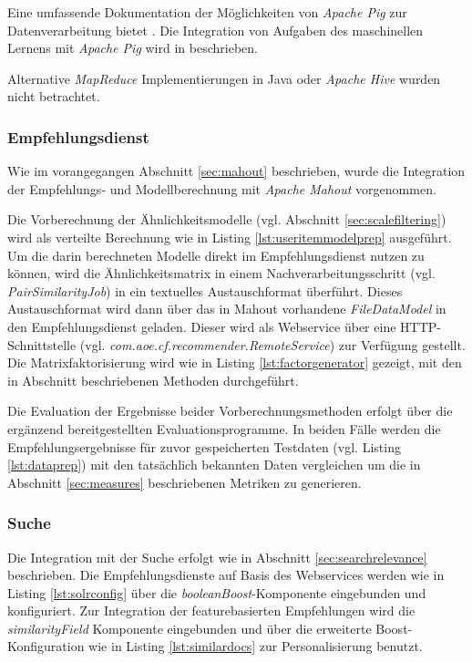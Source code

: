  

Eine umfassende Dokumentation der Möglichkeiten von \textit{Apache Pig} zur Datenverarbeitung bietet \citep{gates2011programming}. Die Integration von Aufgaben des maschinellen Lernens mit  \textit{Apache Pig} wird in  \citep{Lin2012} beschrieben.

Alternative \textit{MapReduce} Implementierungen in Java oder \textit{Apache Hive} wurden nicht betrachtet.

\subsubsection{Empfehlungsdienst} Wie im vorangegangen Abschnitt \ref{sec:mahout} beschrieben, wurde die Integration der Empfehlungs- und Modellberechnung mit \textit{Apache Mahout} vorgenommen.

Die Vorberechnung der Ähnlichkeitsmodelle (vgl. Abschnitt \ref{sec:scalefiltering}) wird als verteilte Berechnung wie in Listing \ref{lst:useritemmodelprep} ausgeführt. Um die darin berechneten Modelle direkt im Empfehlungsdienst nutzen zu können, wird die Ähnlichkeitsmatrix in einem Nachverarbeitungsschritt (vgl. \textit{PairSimilarityJob}) in ein textuelles Austauschformat überführt. Dieses Austauschformat wird dann über das in Mahout vorhandene \textit{FileDataModel} in den Empfehlungsdienst geladen. Dieser wird als Webservice über eine HTTP-Schnittstelle (vgl. \textit{com.aoe.cf.recommender.RemoteService}) zur Verfügung gestellt. Die Matrixfaktorisierung wird wie in Listing \ref{lst:factorgenerator} gezeigt, mit den in Abschnitt \label{sec:myrecommend} beschriebenen Methoden durchgeführt.

Die Evaluation der Ergebnisse beider Vorberechnungsmethoden erfolgt über die ergänzend bereitgestellten Evaluationsprogramme. In beiden Fälle werden die Empfehlungsergebnisse für zuvor gespeicherten Testdaten (vgl. Listing \ref{lst:dataprep}) mit den tatsächlich bekannten Daten vergleichen um die in Abschnitt \ref{sec:measures} beschriebenen Metriken zu generieren.

\subsubsection{Suche}

Die Integration mit der Suche erfolgt wie in Abschnitt \ref{sec:searchrelevance} beschrieben. Die Empfehlungsdienste auf Basis des Webservices werden wie in Listing \ref{lst:solrconfig} über die \textit{booleanBoost}-Komponente eingebunden und konfiguriert. Zur Integration der featurebasierten Empfehlungen wird die \textit{similarityField} Komponente eingebunden und über die erweiterte Boost-Konfiguration wie in Listing \ref{lst:similardocs}  zur Personalisierung benutzt.


